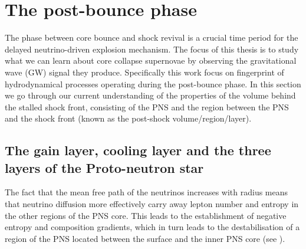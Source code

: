\section{The post-bounce phase}
The phase between core bounce and shock revival is a crucial time period for the delayed neutrino-driven explosion mechanism. 
The focus of this thesis is to study what we can learn about core collapse supernovae
by observing the gravitational wave (GW) signal they produce. Specifically this work focus on
fingerprint of hydrodynamical processes operating during the post-bounce phase. 
In this section we go through our current understanding of the properties of the volume behind
the stalled shock front, consisting of the PNS and the region between the PNS and the shock front (known as the post-shock volume/region/layer). 

\subsection{The gain layer, cooling layer and the three layers of the Proto-neutron star}
The fact that the mean free path of the neutrinos increases with radius means that
neutrino diffusion more effectively carry away lepton number and entropy in the 
other regions of the PNS core. This leads to the establishment of negative 
entropy and composition gradients, which in turn leads to the destabilisation 
of a region of the PNS located between the surface and the inner PNS core (see ).

